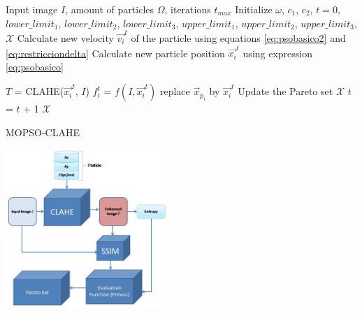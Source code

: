 \documentclass[spanish,twocolumn]{article}
\begin{document}
{\begin{algorithm}[H]
    \scriptsize
    \begin{algorithmic}[1]
        \Require Input image $I$, amount of particles $\Omega$, iterations $t_{max}$
        \State Initialize $\omega$, $c_1$, $c_2$, $t=0$, $lower\_limit_1$, $lower\_limit_2$, $lower\_limit_3$, $upper\_limit_1$, $upper\_limit_2$, $upper\_limit_3$, $\mathscr{X}$
                \State Calculate new velocity $\overrightarrow{v_i}^t$ of the particle  using equations \eqref{eq:psobasico2} and \eqref{eq:restricciondelta}
                \State Calculate new particle position $\overrightarrow{x_i}^t$ using expression \eqref{eq:psobasico}

                \State ${T}$ = CLAHE(${\overrightarrow{x_i}^t}$, ${I}$)
                \State ${f^t_i}$ = $f(I, \overrightarrow{x_i}^t)$%
                    \State replace $\overrightarrow{x}_{p_i}$ by $\overrightarrow{x_i}^t$
                \EndIf
                    \State Update the Pareto set $\mathscr{X}$
                \EndIf
                \State $t$ = $t$ + 1
            \EndFor
        \EndWhile
    \Ensure $\mathscr{X}$
    \end{algorithmic}
    \caption{MOPSO-CLAHE}
    \label{alg:pso_clahe}
\end{algorithm}

\begin{minipage}[b]{1.0\linewidth}
  \vspace{0.4cm}
  \centering
  \centerline{\includegraphics[height=6cm]{Figures/particula_clahe2}}
  \vspace{0.4cm}
  \label{fig:particula_clahe}
\end{minipage}

}
\end{document}
